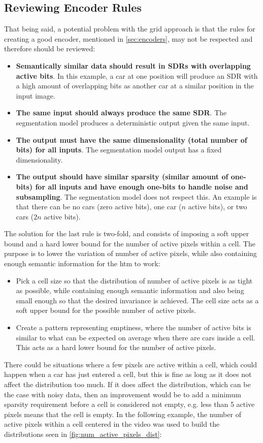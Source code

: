 \subsection{Reviewing Encoder Rules}
That being said, a potential problem with the grid approach is that the rules for creating a good encoder, mentioned in \autoref{sec:encoders}, may not be respected and therefore should be reviewed:
\begin{itemize}
    \item \textbf{Semantically similar data should result in SDRs with overlapping active bits}. In this example, a car at one position will produce an SDR with a high amount of overlapping bits as another car at a similar position in the input image.
    \item \textbf{The same input should always produce the same SDR}. The segmentation model produces a deterministic output given the same input.
    \item \textbf{The output must have the same dimensionality (total number of bits) for all inputs}. The segmentation model output has a fixed dimensionality.
    \item \textbf{The output should have similar sparsity (similar amount of one-bits) for all inputs and have enough one-bits to handle noise and subsampling}. The segmentation model does not respect this. An example is that there can be no cars (zero active bits), one car ($n$ active bits), or two cars ($2n$ active bits).
\end{itemize}
The solution for the last rule is two-fold, and  consists of imposing a soft upper bound and a hard lower bound for the number of active pixels within a cell. The purpose is to lower the variation of number of active pixels, while also containing enough semantic information for the \gls*{htm} to work:
\begin{itemize}
    \item Pick a cell size so that the distribution of number of active pixels is as tight as possible, while containing enough semantic information and also being small enough so that the desired invariance is achieved. The cell size acts as a soft upper bound for the possible number of active pixels.
    \item Create a pattern representing emptiness, where the number of active bits is similar to what can be expected on average when there are cars inside a cell. This acts as a hard lower bound for the number of active pixels.
\end{itemize}
There could be situations where a few pixels are active within a cell, which could happen when a car has just entered a cell, but this is fine as long as it does not affect the distribution too much. If it does affect the distribution, which can be the case with noisy data, then an improvement would be to add a minimum sparsity requirement before a cell is considered not empty, e.g. less than 5 active pixels means that the cell is empty.  In the following example, the number of active pixels within a cell centered in the video was used to build the distributions seen in \autoref{fig:num_active_pixels_dist}:

